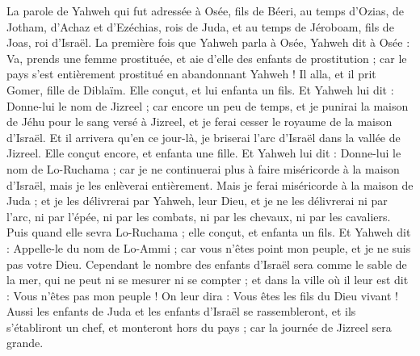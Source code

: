 \begin{multicols}{2}
\VerseOne{}La parole de Yahweh qui fut adressée à Osée, fils de Béeri, au temps d'Ozias, de Jotham, d'Achaz et d'Ezéchias, rois de Juda, et au temps de Jéroboam, fils de Joas, roi d'Israël.
La première fois que Yahweh parla à Osée, Yahweh dit à Osée : Va, prends une femme prostituée, et aie d'elle des enfants de prostitution ; car le pays s'est entièrement prostitué en abandonnant Yahweh !
Il alla, et il prit Gomer, fille de Diblaïm. Elle conçut, et lui enfanta un fils.
Et Yahweh lui dit : Donne-lui le nom de Jizreel ; car encore un peu de temps, et je punirai la maison de Jéhu pour le sang versé à Jizreel, et je ferai cesser le royaume de la maison d'Israël.
Et il arrivera qu'en ce jour-là, je briserai l'arc d'Israël dans la vallée de Jizreel.
Elle conçut encore, et enfanta une fille. Et Yahweh lui dit : Donne-lui le nom de Lo-Ruchama ; car je ne continuerai plus à faire miséricorde à la maison d'Israël, mais je les enlèverai entièrement.
Mais je ferai miséricorde à la maison de Juda ; et je les délivrerai par Yahweh, leur Dieu, et je ne les délivrerai ni par l'arc, ni par l'épée, ni par les combats, ni par les chevaux, ni par les cavaliers.
Puis quand elle sevra Lo-Ruchama ; elle conçut, et enfanta un fils.
Et Yahweh dit : Appelle-le du nom de Lo-Ammi ; car vous n'êtes point mon peuple, et je ne suis pas votre Dieu.
\VerseOne{}Cependant le nombre des enfants d'Israël sera comme le sable de la mer, qui ne peut ni se mesurer ni se compter ; et dans la ville où il leur est dit : Vous n'êtes pas mon peuple ! On leur dira : Vous êtes les fils du Dieu vivant !
Aussi les enfants de Juda et les enfants d'Israël se rassembleront, et ils s'établiront un chef, et monteront hors du pays ; car la journée de Jizreel sera grande.

\end{multicols}
